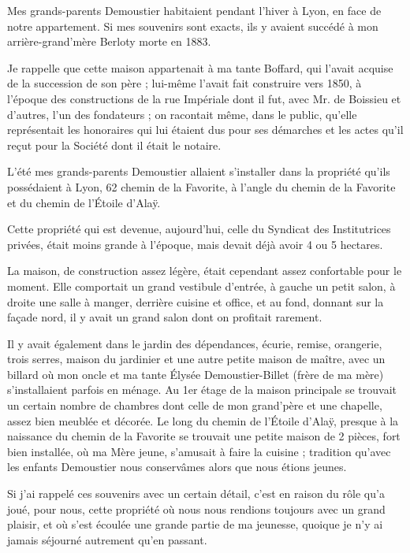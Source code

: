 \documentclass[11pt,a4paper]{report}
\begin{document}
Mes grands-parents Demoustier habitaient pendant l'hiver à Lyon, en face de notre appartement. Si mes souvenirs sont exacts, ils y avaient succédé à mon arrière-grand'mère Berloty morte en 1883.

Je rappelle que cette maison appartenait à ma tante Boffard, qui l'avait acquise de la succession de son père ; lui-même l'avait fait construire vers 1850, à l'époque des constructions de la rue Impériale dont il fut, avec Mr. de Boissieu et d'autres, l'un des fondateurs ; on racontait même, dans le public, qu'elle représentait les honoraires qui lui étaient dus pour ses démarches et les actes qu'il reçut pour la Société dont il était le notaire.

L'été mes grands-parents Demoustier allaient s'installer dans la propriété qu'ils possédaient à Lyon, 62 chemin de la Favorite, à l'angle du chemin de la Favorite et du chemin de l'Étoile d'Alaÿ.

Cette propriété qui est devenue, aujourd'hui, celle du Syndicat des Institutrices privées, était moins grande à l'époque, mais devait déjà avoir 4 ou 5 hectares.

La maison, de construction assez légère, était cependant assez confortable pour le moment. Elle comportait un grand vestibule d'entrée, à gauche un petit salon, à droite une salle à manger, derrière cuisine et office, et au fond, donnant sur la façade nord, il y avait un grand salon dont on profitait rarement.

Il y avait également dans le jardin des dépendances, écurie, remise, orangerie, trois serres, maison du jardinier et une autre petite maison de maître, avec un billard où mon oncle et ma tante Élysée Demoustier-Billet (frère de ma mère) s'installaient parfois en ménage. Au 1er étage de la maison principale se trouvait un certain nombre de chambres dont celle de mon grand'père et une chapelle, assez bien meublée et décorée. Le long du chemin de l'Étoile d'Alaÿ, presque à la naissance du chemin de la Favorite se trouvait une petite maison de 2 pièces, fort bien installée, où ma Mère jeune, s'amusait à faire la cuisine ; tradition qu'avec les enfants Demoustier nous conservâmes alors que nous étions jeunes.

Si j'ai rappelé ces souvenirs avec un certain détail, c'est en raison du rôle qu'a joué, pour nous, cette propriété où nous nous rendions toujours avec un grand plaisir, et où s'est écoulée une grande partie de ma jeunesse, quoique je n'y ai jamais séjourné autrement qu'en passant.
\end{document}
